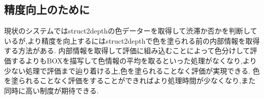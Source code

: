 \subsection{精度向上のために}
現状のシステムではstruct2depthの色データーを取得して渋滞か否かを判断しているが,より精度を向上するにはstruct2depthで色を塗られる前の内部情報を取得する方法がある.
内部情報を取得して評価に組み込むことによって色分けして評価するよりもBOXを描写して色情報の平均を取るといった処理がなくなり,より少ない処理で評価まで辿り着ける上,色を塗られることなく評価が実現できる.
色を塗られることなく評価をすることができればより処理時間が少なくなり,また同時に高い制度が期待できる.